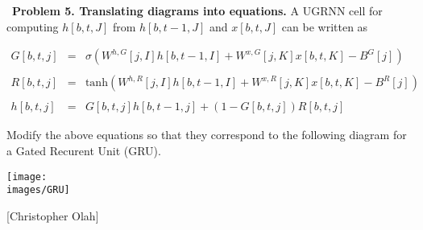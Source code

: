 \documentclass{article}
\newcommand{\solution}[1]{}
\begin{document}
\bigskip
~{\bf Problem 5. Translating diagrams into equations.} A UGRNN cell for computing $h[b,t,J]$ from $h[b,t-1,J]$ and $x[b,t,J]$ can be written as

\begin{eqnarray*}
G[b,t,j] & = & \sigma\left(W^{h,G}[j,I] h[b,t\!-\!1,I] +  W^{x,G}[j,K] x[b,t,K] - B^G[j]\right) \\
\\
R[b,t,j] & = & \mathrm{tanh}\left(W^{h,R}[j,I] h[b,t\!-\!1,I] + W^{x,R}[j,K] x[b,t,K] - B^R[j]\right) \\
\\
h[b,t,j] & = & G[b,t,j]h[b,t\!-\!1,j] + (1-G[b,t,j])R[b,t,j]
\end{eqnarray*}


Modify the above equations so that they correspond to the following diagram for a Gated Recurent Unit (GRU).

\centerline{\texttt{[image: \\images/GRU]}}
\centerline{{\small [Christopher Olah]}}

\solution{

  \begin{eqnarray*}
    G_1[b,t,j] & = & \sigma\left(W^{h,G_1}[j,I] h[b,t\!-\!1,I] +  W^{x,G_1}[j,K] x[b,t,K] - B^{G_1}[j]\right) \\
    \\
    h'[b,t,j] & = & G_1[b,t,j]h[b,t\!-\!1,j] \\
    \\
    G_2[b,t,j] & = & \sigma\left(W^{h,G_2}[j,I] h[b,t\!-\!1,I] +  W^{x,G_2}[j,K] x[b,t,K] - B^{G_2}[j]\right) \\
    \\
    R[b,t,j] & = & \mathrm{tanh}\left(W^{h,R}[j,I] h'[b,t,I] + W^{x,R}[j,K] x[b,t,K] - B^R[j]\right) \\
    \\
    h[b,t,j] & = & (1-G_2[b,t,j])h[b,t\!-\!1,j] + G_2[b,t,j]R[b,t,j]
  \end{eqnarray*}
}
\end{document}
